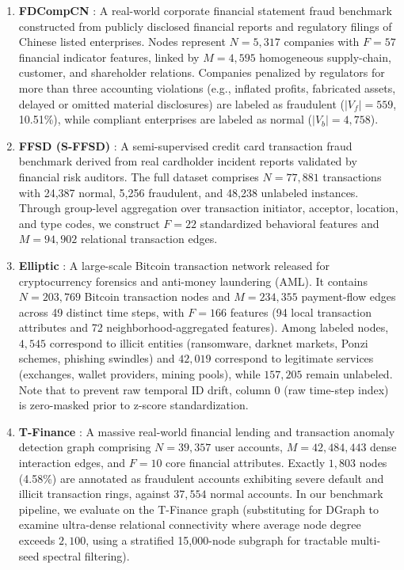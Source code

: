 \documentclass[10pt,a4paper,twocolumn]{article}
\begin{document}
\begin{enumerate}
  \item \textbf{FDCompCN} \cite{ref41}: A real-world corporate financial statement fraud benchmark constructed from publicly disclosed financial reports and regulatory filings of Chinese listed enterprises. Nodes represent $N = 5,317$ companies with $F = 57$ financial indicator features, linked by $M = 4,595$ homogeneous supply-chain, customer, and shareholder relations. Companies penalized by regulators for more than three accounting violations (e.g., inflated profits, fabricated assets, delayed or omitted material disclosures) are labeled as fraudulent ($|V_f| = 559$, 10.51\%), while compliant enterprises are labeled as normal ($|V_b| = 4,758$).
  \item \textbf{FFSD (S-FFSD)} \cite{ref42}: A semi-supervised credit card transaction fraud benchmark derived from real cardholder incident reports validated by financial risk auditors. The full dataset comprises $N = 77,881$ transactions with 24,387 normal, 5,256 fraudulent, and 48,238 unlabeled instances. Through group-level aggregation over transaction initiator, acceptor, location, and type codes, we construct $F = 22$ standardized behavioral features and $M = 94,902$ relational transaction edges.
  \item \textbf{Elliptic} \cite{ref43}: A large-scale Bitcoin transaction network released for cryptocurrency forensics and anti-money laundering (AML). It contains $N = 203,769$ Bitcoin transaction nodes and $M = 234,355$ payment-flow edges across 49 distinct time steps, with $F = 166$ features (94 local transaction attributes and 72 neighborhood-aggregated features). Among labeled nodes, $4,545$ correspond to illicit entities (ransomware, darknet markets, Ponzi schemes, phishing swindles) and $42,019$ correspond to legitimate services (exchanges, wallet providers, mining pools), while $157,205$ remain unlabeled. Note that to prevent raw temporal ID drift, column 0 (raw time-step index) is zero-masked prior to z-score standardization.
  \item \textbf{T-Finance} \cite{ref32,ref38}: A massive real-world financial lending and transaction anomaly detection graph comprising $N = 39,357$ user accounts, $M = 42,484,443$ dense interaction edges, and $F = 10$ core financial attributes. Exactly $1,803$ nodes (4.58\%) are annotated as fraudulent accounts exhibiting severe default and illicit transaction rings, against $37,554$ normal accounts. In our benchmark pipeline, we evaluate on the T-Finance graph (substituting for DGraph \cite{ref44} to examine ultra-dense relational connectivity where average node degree exceeds $2,100$, using a stratified 15,000-node subgraph for tractable multi-seed spectral filtering).
\end{enumerate}
\end{document}
